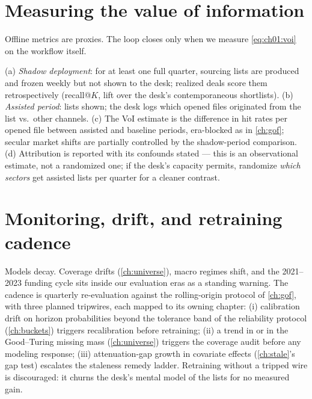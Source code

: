 \section{Measuring the value of information}\label{ch12:sec:voi}

Offline metrics are proxies. The loop closes only when we measure
\cref{eq:ch01:voi} on the workflow itself.

\begin{protocol}\label{prot:ch12:voi}
(a) \emph{Shadow deployment}: for at least one full quarter, sourcing
lists are produced and frozen weekly but not shown to the desk; realized
deals score them retrospectively (recall@$K$, lift over the desk's
contemporaneous shortlists). (b) \emph{Assisted period}: lists shown;
the desk logs which opened files originated from the list vs.\ other
channels. (c) The VoI estimate is the difference in hit rates per opened
file between assisted and baseline periods, era-blocked as in
\cref{ch:gof}; secular market shifts are partially controlled by the
shadow-period comparison. (d) Attribution is reported with its
confounds stated --- this is an observational estimate, not a randomized
one; if the desk's capacity permits, randomize \emph{which sectors} get
assisted lists per quarter for a cleaner contrast.
\end{protocol}

\section{Monitoring, drift, and retraining cadence}\label{ch12:sec:monitoring}

Models decay. Coverage drifts (\cref{ch:universe}), macro regimes shift,
and the 2021--2023 funding cycle sits inside our evaluation eras as a
standing warning. The cadence is quarterly re-evaluation against the
rolling-origin protocol of \cref{ch:gof}, with three planned tripwires,
each mapped to its owning chapter: (i) calibration drift on horizon
probabilities beyond the tolerance band of the reliability protocol
(\cref{ch:buckets}) triggers recalibration before retraining; (ii) a
trend in  or in the Good--Turing missing mass
(\cref{ch:universe}) triggers the coverage audit before any modeling
response; (iii) attenuation-gap growth in covariate effects
(\cref{ch:stale}'s gap test) escalates the staleness remedy ladder.
Retraining without a tripped wire is discouraged: it churns the
desk's mental model of the lists for no measured gain.

